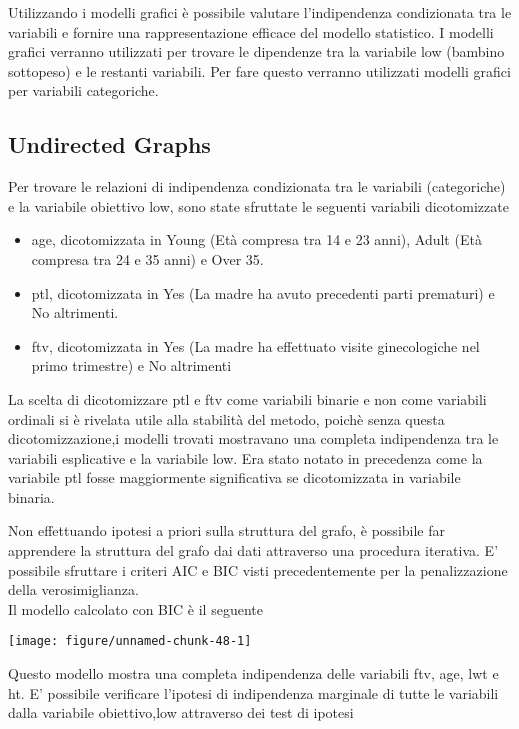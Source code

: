 \documentclass{article}\usepackage[]{graphicx}\usepackage[]{color}
\makeatletter
\def\maxwidth{ %
  \ifdim\Gin@nat@width>\linewidth
    \linewidth
  \else
    \Gin@nat@width
  \fi
}
\newenvironment{knitrout}{}{} %
\makeatother
\begin{document}
Utilizzando i modelli grafici è possibile valutare l'indipendenza condizionata tra le variabili e fornire una rappresentazione efficace del modello statistico.
I modelli grafici verranno utilizzati per trovare le dipendenze tra la variabile low (bambino sottopeso) e le restanti variabili.
Per fare questo verranno utilizzati modelli grafici per variabili categoriche.

\subsection{Undirected Graphs}

Per trovare le relazioni di indipendenza condizionata tra le variabili (categoriche) e la variabile obiettivo low, sono state sfruttate le seguenti variabili dicotomizzate
\begin{itemize}
\item{age}, dicotomizzata in Young (Età compresa tra 14 e 23 anni), Adult (Età compresa tra 24 e 35 anni) e Over 35.
\item {ptl}, dicotomizzata in Yes (La madre ha avuto precedenti parti prematuri) e No altrimenti.
\item {ftv}, dicotomizzata in Yes (La madre ha effettuato visite ginecologiche nel primo trimestre) e No altrimenti
\end{itemize}
La scelta di dicotomizzare ptl e ftv come variabili binarie e non come variabili ordinali si è rivelata utile alla stabilità del metodo, poichè senza questa dicotomizzazione,i modelli trovati mostravano una completa indipendenza tra le variabili esplicative e la variabile low.
Era stato notato in precedenza come la variabile ptl fosse maggiormente significativa se dicotomizzata in variabile binaria.

Non effettuando ipotesi a priori sulla struttura del grafo, è possibile far apprendere la struttura del grafo dai dati attraverso una procedura iterativa.
E' possibile sfruttare i criteri AIC e BIC visti precedentemente per la penalizzazione della verosimiglianza.\\
Il modello calcolato con BIC è il seguente



\begin{knitrout}
\color{fgcolor}
\texttt{[image: figure/unnamed-chunk-48-1]} 
\end{knitrout}

Questo modello mostra una completa indipendenza delle variabili ftv, age, lwt e ht.
E' possibile verificare l'ipotesi di indipendenza marginale di tutte le variabili dalla variabile obiettivo,low attraverso dei test di ipotesi
\end{document}
